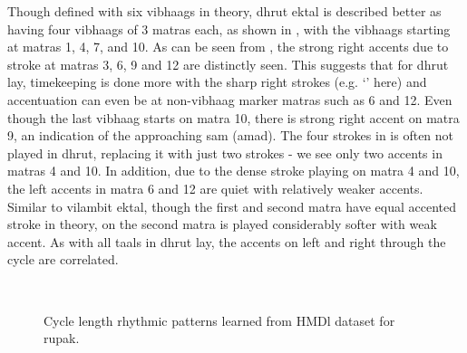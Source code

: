 \begin{description}[style=unboxed,leftmargin=0cm]
\item[\textbf{\Gls{madhyam} and \gls{dhrut} \gls{lay} \gls{ektal}}:] Though defined with six \glspl{vibhaag} in theory, \gls{dhrut} \gls{ektal} is described better as having four \glspl{vibhaag} of 3 \glspl{matra} each, as shown in , with the \glspl{vibhaag} starting at \glspl{matra} 1, 4, 7, and 10. As can be seen from , the strong right accents due to  stroke at \glspl{matra} 3, 6, 9 and 12 are distinctly seen. This suggests that for \gls{dhrut} \gls{lay}, timekeeping is done more with the sharp right strokes (e.g. `' here) and accentuation can even be at non-\gls{vibhaag} marker \glspl{matra} such as 6 and 12. Even though the last \gls{vibhaag} starts on matra 10, there is strong right accent on matra 9, an indication of the approaching \gls{sam} (\gls{amad}). The four strokes in     is often not played in \gls{dhrut}, replacing it with just two strokes   - we see only two accents in \glspl{matra} 4 and 10. In addition, due to the dense stroke playing on \gls{matra} 4 and 10, the left accents in \gls{matra} 6 and 12 are quiet with relatively weaker accents. Similar to \gls{vilambit} \gls{ektal}, though the first and second matra have equal accented  stroke in theory,  on the second \gls{matra} is played considerably softer with weak accent. As with all \glspl{taal} in \gls{dhrut} \gls{lay}, the accents on left and right through the cycle are correlated. 
\end{description}
%
\begin{figure}[t]
\captionsetup[subfigure]{labelformat=empty}
\centering
{} \\ \vspace{-1.35cm}
\caption[Rhythm patterns in \gls{rupak} learned from \acrshort{HMDl} dataset]{Cycle length rhythmic patterns learned from \acrshort{HMDl} dataset for \gls{rupak}.}\label{fig:tt:HMDl:rupak}
\end{figure}
%
%

